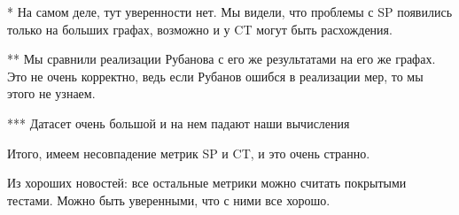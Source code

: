 \documentclass{article}
\begin{document}
{
\small
* На самом деле, тут уверенности нет. Мы видели, что проблемы с SP появились только на больших графах, возможно и у CT могут быть расхождения.

** Мы сравнили реализации Рубанова с его же результатами на его же графах. Это не очень корректно, ведь если Рубанов ошибся в реализации мер, то мы этого не узнаем.

*** Датасет очень большой и на нем падают наши вычисления
}

\medskip

Итого, имеем несовпадение метрик SP и CT, и это очень странно. 

Из хороших новостей: все остальные метрики можно считать покрытыми тестами. Можно быть уверенными, что с ними все хорошо.
\end{document}
